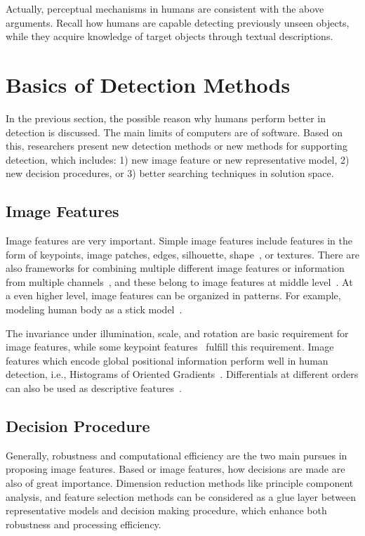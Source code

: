 Actually, perceptual mechanisms in humans are consistent with the above arguments. Recall how humans are capable detecting previously unseen objects, while they acquire knowledge of target objects through textual descriptions.

\section{Basics of Detection Methods}

In the previous section, the possible reason why humans perform better in detection is discussed. The main limits of computers are of software. Based on this, researchers present new detection methods or new methods for supporting detection, which includes: 1) new image feature or new representative model, 2) new decision procedures, or 3) better searching techniques in solution space.
\subsection{Image Features}
Image features are very important. Simple image features include features in the form of keypoints, image patches, edges,  silhouette, shape~\citep{scontext}, or textures. There are also frameworks for combining multiple different image features or information from multiple channels~\citep{regionc,bgf,lbp,lss}, and these belong to image features at middle level~\citep{midf}. At a even higher level, image features can be  organized in patterns. For example, modeling human body as a stick model~\citep{stickb}.

The invariance under illumination, scale, and rotation are basic requirement for image features, while some keypoint features~\citep{ij2,o12,o14,o15,o2} fulfill this requirement. Image features which encode global positional information perform well in human detection, i.e., Histograms of Oriented
Gradients~\citep{ij4}. Differentials at different orders can also be used as descriptive features~\citep{regionc}.



\subsection{Decision Procedure}
Generally, robustness and computational efficiency are the two main pursues in proposing image features. Based or image features, how decisions are made are also of great importance. Dimension reduction methods like principle component analysis, and feature selection methods can be considered as a glue layer between representative models and decision making procedure, which enhance both robustness and processing efficiency.


